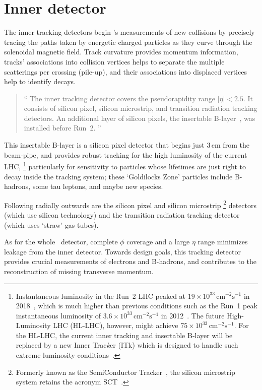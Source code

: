 \section{Inner detector}
\label{sec:atlas_inner}
The inner tracking detectors begin \atlas's measurements of new collisions
by precisely tracing the paths taken by energetic charged particles
as they curve through the solenoidal magnetic field.
Track curvature provides momentum information,
tracks' associations into collision vertices helps to separate the multiple
scatterings per crossing (pile-up),
and their associations into displaced vertices help to identify
decays.
\begin{quote}
``%
The inner tracking detector covers the pseudorapidity range $|\eta| < 2.5$.
It consists of silicon pixel, silicon microstrip, and transition radiation
tracking detectors.
An additional layer of silicon pixels, the insertable
B-layer~\cite{ATLAS-TDR-19, PIX-2018-001}, was installed before Run~2.%
''~\cite{atlas2022searches}
\end{quote}
This insertable B-layer is a silicon pixel detector that begins just
$3\,\textrm{cm}$ from the beam-pipe, and provides robust tracking for the
high luminosity of the current LHC,%
\footnote{%
Instantaneous luminosity in the Run~2 LHC peaked at
$19\times10^{33}\,\mathrm{cm}^{-2}\mathrm{s}^{-1}$ in 2018~\cite{ATLAS:2022hro},
which is much higher than previous conditions such as the Run~1 peak
instantaneous luminosity of
$3.6\times10^{33}\,\mathrm{cm}^{-2}\mathrm{s}^{-1}$ in 2012~\cite{ATLAS:2013tpw}.
The future High-Luminosity LHC (HL-LHC), however, might achieve
$75\times10^{33}\,\mathrm{cm}^{-2}\mathrm{s}^{-1}$.
For the HL-LHC, the current inner tracking and insertable B-layer will
be replaced by a new Inner Trac\emph{k}er (ITk) which is designed to handle such
extreme luminosity conditions~\cite{CERN-LHCC-2017-021}.
}
particularly for sensitivity to particles whose lifetimes are just right to
decay inside the tracking system;
these `Goldilocks Zone' particles include B-hadrons, some tau leptons, and
maybe new species.

Following radially outwards are the silicon pixel and silicon microstrip%
\footnote{%
Formerly known as the SemiConductor Tracker~\cite{atlas1999design1},
the silicon microstrip system retains the acronym
SCT~\cite{atlas2008experiment}.%
}
detectors (which use silicon technology)
and the transition radiation tracking detector
(which uses `straw' gas tubes).

As for the whole \atlas\ detector, complete $\phi$ coverage and a large $\eta$
range minimizes leakage from the inner detector.
Towards design goals, this tracking detector provides crucial
measurements of electrons and B-hadrons,
and contributes to the reconstruction of missing transverse momentum.


